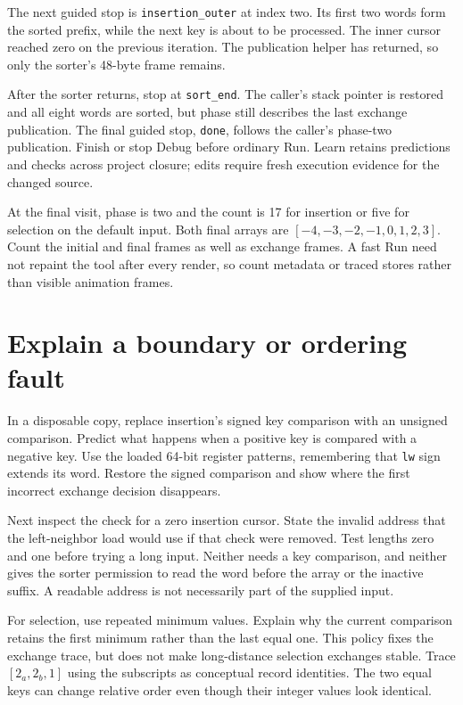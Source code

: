 The next guided stop is \texttt{insertion\_outer} at index two. Its first two
words form the sorted prefix, while the next key is about to be processed. The
inner cursor reached zero on the previous iteration. The publication helper has
returned, so only the sorter's 48-byte frame remains.

After the sorter returns, stop at \texttt{sort\_end}. The caller's stack pointer
is restored and all eight words are sorted, but phase still describes the last
exchange publication. The final guided stop, \texttt{done}, follows the caller's
phase-two publication. Finish or stop Debug before ordinary Run. Learn retains
predictions and checks across project closure; edits require fresh execution
evidence for the changed source.

At the final visit, phase is two and the count is 17 for insertion or five for
selection on the default input. Both final arrays are
$[-4,-3,-2,-1,0,1,2,3]$. Count the initial and final frames as well as exchange
frames. A fast Run need not repaint the tool after every render, so count metadata
or traced stores rather than visible animation frames.

\section{Explain a boundary or ordering fault}

In a disposable copy, replace insertion's signed key comparison with an unsigned
comparison. Predict what happens when a positive key is compared with a negative
key. Use the loaded 64-bit register patterns, remembering that \texttt{lw} sign
extends its word. Restore the signed comparison and show where the first incorrect
exchange decision disappears.

Next inspect the check for a zero insertion cursor. State the invalid address that
the left-neighbor load would use if that check were removed. Test lengths zero and
one before trying a long input. Neither needs a key comparison, and neither gives
the sorter permission to read the word before the array or the inactive suffix.
A readable address is not necessarily part of the supplied input.

For selection, use repeated minimum values. Explain why the current comparison
retains the first minimum rather than the last equal one. This policy fixes the
exchange trace, but does not make long-distance selection exchanges stable. Trace
$[2_a,2_b,1]$ using the subscripts as conceptual record identities. The two equal
keys can change relative order even though their integer values look identical.


